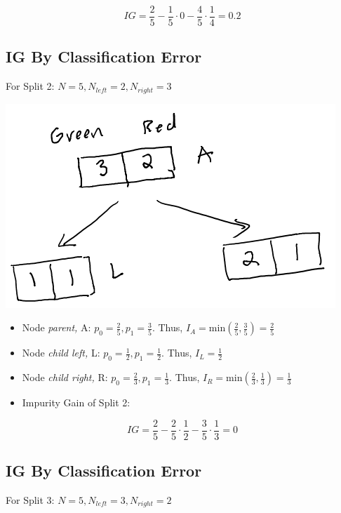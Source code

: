 \documentclass[
]{article}
\begin{document}
\[IG = \frac{2}{5} - \frac{1}{5} \cdot 0-\frac{4}{5} \cdot \frac{1}{4} = 0.2\]

\hypertarget{ig-by-classification-error-1}{%
\subsection{IG By Classification
Error}\label{ig-by-classification-error-1}}

For Split 2: \(N = 5, N_{left} =2, N_{right} = 3\)

\includegraphics{images/im3.png}

\begin{itemize}
\item
  Node \emph{parent,} A: \(p_0 = \frac{2}{5}, p_1 = \frac{3}{5}\). Thus,
  \(I_{A} = \text{min}(\frac{2}{5}, \frac{3}{5}) = \frac{2}{5}\)
\item
  Node \emph{child left,} L: \(p_0 = \frac{1}{2}, p_1 = \frac{1}{2}\).
  Thus, \(I_{L} = \frac{1}{2}\)
\item
  Node \emph{child right,} R: \(p_0 = \frac{2}{3}, p_1 = \frac{1}{3}\).
  Thus, \(I_{R} = \text{min}(\frac{2}{3}, \frac{1}{3}) = \frac{1}{3}\)
\item
  Impurity Gain of Split 2:
\end{itemize}

\[IG = \frac{2}{5} - \frac{2}{5} \cdot \frac{1}{2}-\frac{3}{5} \cdot \frac{1}{3} = 0\]

\hypertarget{ig-by-classification-error-2}{%
\subsection{IG By Classification
Error}\label{ig-by-classification-error-2}}

For Split 3: \(N = 5, N_{left} =3, N_{right} = 2\)
\end{document}
